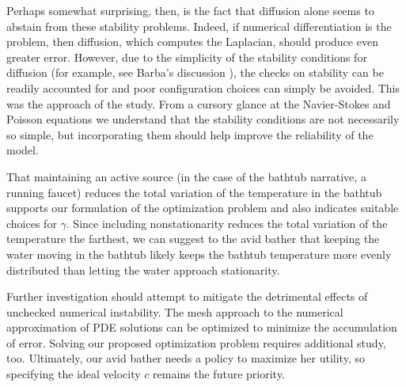 \documentclass[12pt]{amsart}
\begin{document}
Perhaps somewhat surprising, then, is the fact that diffusion alone seems to
abstain from these stability problems. Indeed, if numerical differentiation is
the problem, then diffusion, which computes the Laplacian, should produce even
greater error. However, due to the simplicity of the stability conditions for
diffusion (for example, see Barba's discussion \cite{12-steps}), the checks on
stability can be readily accounted for and poor configuration choices can simply
be avoided. This was the approach of the study. From a cursory glance at the
Navier-Stokes and Poisson equations we understand that the stability conditions
are not necessarily so simple, but incorporating them should help improve the
reliability of the model.

That maintaining an active source (in the case of the bathtub narrative, a
running faucet) reduces the total variation of the temperature in the bathtub
supports our formulation of the optimization problem and also indicates suitable
choices for $\gamma$. Since including nonstationarity reduces the total
variation of the temperature the farthest, we can suggest to the avid bather
that keeping the water moving in the bathtub likely keeps the bathtub
temperature more evenly distributed than letting the water approach
stationarity.

Further investigation should attempt to mitigate the detrimental effects of
unchecked numerical instability. The mesh approach to the numerical
approximation of PDE solutions can be optimized \cite{betounes, 12-steps} to
minimize the accumulation of error. Solving our proposed optimization problem
requires additional study, too. Ultimately, our avid bather needs a policy to
maximize her utility, so specifying the ideal velocity $c$ remains the future
priority.

\nocite{*}


\printbibliography
\end{document}
